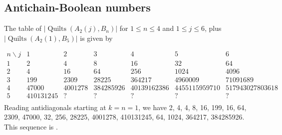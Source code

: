 \documentclass[12pt]{amsart}
\numberwithin{equation}{section}
\theoremstyle{definition}
\newcommand{\quilt}{\operatorname{Quilts}}
\begin{document}
\subsection{Antichain-Boolean numbers}

The table of $|\quilt(A_2(j), B_{n})|$ for $1\leq n\leq 4$ and
$1\leq j \leq 6$, plus $|\quilt(A_{2}(1), B_{5})|$ is given by

$$\begin{array}{c|cccccc}
   n \backslash j & 1 & 2 & 3 & 4 & 5 & 6\\ \hline
                1 & 2 & 4 & 8 & 16 & 32 & 64\\
2 & 4 & 16 & 64 & 256 & 1024 & 4096 \\
3 & 199 & 2309 & 28225 & 364217 & 4960009 & 71091689 \\
4 & 47000 & 4001278 & 384285926 & 40139162386 & 4455115959710 & 517943027803618 \\
5 & 410131245  & ?  & ? & ? & ? & ?\\
\end{array}$$
Reading antidiagonals starting at $k=n=1$, we have 2, 4, 4, 8, 16,
199, 16, 64, 2309, 47000, 32, 256, 28225, 4001278, 410131245, 64,
1024, 364217, 384285926.  This sequence is \cite[A374821]{oeis}.

\end{document}

